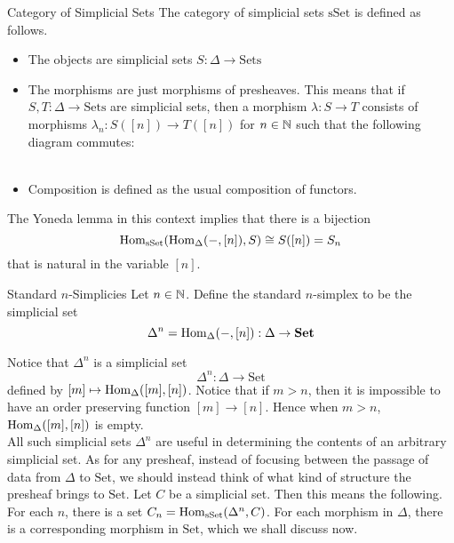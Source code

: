 \documentclass[a4paper]{article}
\begin{document}
\begin{defn}{Category of Simplicial Sets}{} The category of simplicial sets $\text{sSet}$ is defined as follows. 
\begin{itemize}
\item The objects are simplicial sets $S:\Delta\to\text{Sets}$
\item The morphisms are just morphisms of presheaves. This means that if $S,T:\Delta\to\text{Sets}$ are simplicial sets, then a morphism $\lambda:S\to T$ consists of morphisms $\lambda_n:S([n])\to T([n])$ for $n\in\mathbb{N}$ such that the following diagram commutes: \\~\\
\item Composition is defined as the usual composition of functors. 
\end{itemize}
\end{defn}

The Yoneda lemma in this context implies that there is a bijection $$\operatorname{Hom}_{\text{sSet}}(\operatorname{Hom}_\Delta(-,[n]),S)\cong S([n])=S_n$$ that is natural in the variable $[n]$. 

\begin{defn}{Standard $n$-Simplicies}{} Let $n\in\mathbb{N}$. Define the standard $n$-simplex to be the simplicial set $$\Delta^n=\operatorname{Hom}_\Delta(-,[n]):\Delta\to\bold{Set}$$
\end{defn}

Notice that $\Delta^n$ is a simplicial set $$\Delta^n:\Delta\to\text{Set}$$ defined by $[m]\mapsto\operatorname{Hom}_\Delta([m],[n])$. Notice that if $m>n$, then it is impossible to have an order preserving function $[m]\to[n]$. Hence when $m>n$, $\operatorname{Hom}_\Delta([m],[n])$ is empty. \\

All such simplicial sets $\Delta^n$ are useful in determining the contents of an arbitrary simplicial set. As for any presheaf, instead of focusing between the passage of data from $\Delta$ to $\text{Set}$, we should instead think of what kind of structure the presheaf brings to $\text{Set}$. Let $C$ be a simplicial set. Then this means the following. For each $n$, there is a set $C_n=\operatorname{Hom}_\text{sSet}(\Delta^n,C)$. For each morphism in $\Delta$, there is a corresponding morphism in $\text{Set}$, which we shall discuss now. 
\end{document}
